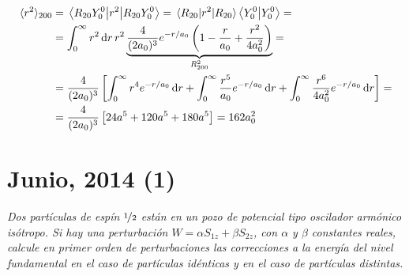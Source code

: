 \begin{equation}
  \begin{split}
    \langle r^2\rangle_{200} &= \mel{R_{20}Y_0^0}{r^2}{R_{20}Y_0^0}
    = \mel{R_{20}}{r^2}{R_{20}}\braket{Y_0^0}{Y_0^0} = \\
    &= \int_0^\infty r^2 \dd{r}  r^2
    \underbrace{\frac{4}{(2a_0)^3}e^{-r/a_0} \left( 1- \frac{r}{a_0}+\frac{r^2}{4a_0^2} \right)}_{R_{200}^2} = \\
    &= \frac{4}{(2a_0)^3} \left[ 
      \int_0^\infty r^4 e^{-r/a_0} \dd{r} +
      \int_0^\infty \frac{r^5}{a_0} e^{-r/a_0} \dd{r} +
      \int_0^\infty \frac{r^6}{4a_0^2} e^{-r/a_0} \dd{r} 
    \right] = \\
    &= \frac{4}{(2a_0)^3} \left[ 24a^5 + 120a^5 + 180a^5 \right] = 162a_0^2
  \end{split}
\end{equation}

\chapter{Junio, 2014 (1)}
\begin{tcolorbox}[halign=left]
  \emph{Dos partículas de espín ${\nicefrac{1}{2}}$ están en un pozo de potencial
    tipo oscilador armónico isótropo. Si hay una perturbación
    $W=\alpha S_{1z} +\beta S_{2z}$, con $\alpha$ y $\beta$ constantes
    reales, calcule en primer orden de perturbaciones las correcciones a
    la energía del nivel fundamental en el caso de partículas
    idénticas y en el caso de partículas distintas.}
\end{tcolorbox}

